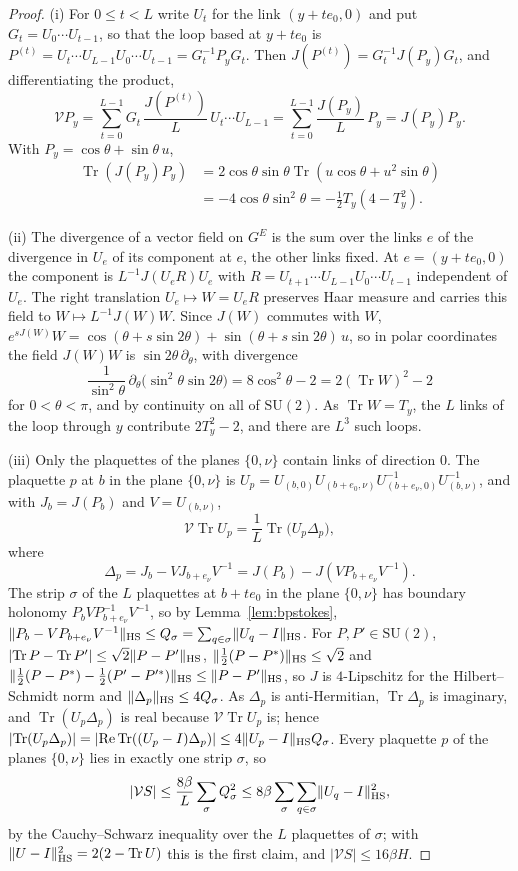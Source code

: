 \documentclass[aps,prd,twocolumn,superscriptaddress,nofootinbib,longbibliography,floatfix,amsmath,amssymb,10pt]{revtex4-2}
\theoremstyle{definition}
\theoremstyle{remark}
\newcommand{\SU}{\mathrm{SU}}
\newcommand{\Tr}{\operatorname{Tr}}
\begin{document}
\begin{proof}
(i) For $0\le t<L$ write $U_t$ for the link $(y+te_0,0)$ and put $G_t=U_0
\cdots U_{t-1}$, so that the loop based at $y+te_0$ is $P^{(t)}=U_t\cdots
U_{L-1}U_0\cdots U_{t-1}=G_t^{-1}P_yG_t$. Then
$J(P^{(t)})=G_t^{-1}J(P_y)G_t$, and differentiating the product,
\[
\mathcal VP_y=\sum_{t=0}^{L-1}G_t\,\frac{J(P^{(t)})}L\,U_t\cdots U_{L-1}
=\sum_{t=0}^{L-1}\frac{J(P_y)}L\,P_y=J(P_y)P_y .
\]
With $P_y=\cos\theta+\sin\theta\,u$,
\begin{align*}
\Tr(J(P_y)P_y)&=2\cos\theta\sin\theta\Tr(u\cos\theta+u^2\sin\theta)\\
&=-4\cos\theta\sin^2\theta=-\tfrac12T_y(4-T_y^2).
\end{align*}

(ii) The divergence of a vector field on $G^E$ is the sum over the links $e$
of the divergence in $U_e$ of its component at $e$, the other links fixed.
At $e=(y+te_0,0)$ the component is $L^{-1}J(U_eR)U_e$ with $R=U_{t+1}\cdots
U_{L-1}U_0\cdots U_{t-1}$ independent of $U_e$. The right translation
$U_e\mapsto W=U_eR$ preserves Haar measure and carries this field to
$W\mapsto L^{-1}J(W)W$. Since $J(W)$ commutes with $W$, $e^{sJ(W)}W=\cos(
\theta+s\sin2\theta)+\sin(\theta+s\sin2\theta)\,u$, so in polar coordinates
the field $J(W)W$ is $\sin2\theta\,\partial_\theta$, with divergence
\[
\frac1{\sin^2\theta}\,\partial_\theta\bigl(\sin^2\theta\sin2\theta\bigr)
=8\cos^2\theta-2=2(\Tr W)^2-2
\]
for $0<\theta<\pi$, and by continuity on all of $\SU(2)$. As $\Tr W=T_y$,
the $L$ links of the loop through $y$ contribute $2T_y^2-2$, and there are
$L^3$ such loops.

(iii) Only the plaquettes of the planes $\{0,\nu\}$ contain links of
direction $0$. The plaquette $p$ at $b$ in the plane $\{0,\nu\}$ is $U_p=
U_{(b,0)}U_{(b+e_0,\nu)}U_{(b+e_\nu,0)}^{-1}U_{(b,\nu)}^{-1}$, and with
$J_b=J(P_b)$ and $V=U_{(b,\nu)}$,
\[
\mathcal V\Tr U_p=\frac1L\Tr\bigl(U_p\Delta_p\bigr),
\]
where
\[
\Delta_p=J_b-VJ_{b+e_\nu}V^{-1}=J(P_b)-J(VP_{b+e_\nu}V^{-1}).
\]
The strip $\sigma$ of the $L$ plaquettes at $b+te_0$ in the plane
$\{0,\nu\}$ has boundary holonomy $P_bVP_{b+e_\nu}^{-1}V^{-1}$, so by
Lemma~\ref{lem:bpstokes}, $\lVert P_b-VP_{b+e_\nu}V^{-1}\rVert_{\rm HS}\le
Q_\sigma=\sum_{q\in\sigma}\lVert U_q-I\rVert_{\rm HS}$. For $P,P'\in
\SU(2)$, $\lvert\Tr P-\Tr P'\rvert\le\sqrt2\lVert P-P'\rVert_{\rm HS}$,
$\lVert\frac12(P-P^*)\rVert_{\rm HS}\le\sqrt2$ and $\lVert\frac12(P-P^*)-
\frac12(P'-P'^*)\rVert_{\rm HS}\le\lVert P-P'\rVert_{\rm HS}$, so $J$ is
$4$-Lipschitz for the Hilbert--Schmidt norm and $\lVert\Delta_p\rVert_{\rm
HS}\le4Q_\sigma$. As $\Delta_p$ is anti-Hermitian, $\Tr\Delta_p$ is
imaginary, and $\Tr(U_p\Delta_p)$ is real because $\mathcal V\Tr U_p$ is;
hence $\lvert\Tr(U_p\Delta_p)\rvert=\lvert\operatorname{Re}\Tr((U_p-I)
\Delta_p)\rvert\le4\lVert U_p-I\rVert_{\rm HS}Q_\sigma$. Every plaquette $p$
of the planes $\{0,\nu\}$ lies in exactly one strip $\sigma$, so
\[
\lvert\mathcal VS\rvert\le\frac{8\beta}L\sum_\sigma Q_\sigma^2\le8\beta
\sum_\sigma\sum_{q\in\sigma}\lVert U_q-I\rVert_{\rm HS}^2,
\]
by the Cauchy--Schwarz inequality over the $L$ plaquettes of $\sigma$; with
$\lVert U-I\rVert_{\rm HS}^2=2(2-\Tr U)$ this is the first claim, and
$\lvert\mathcal VS\rvert\le16\beta H$.


\end{proof}
\end{document}
